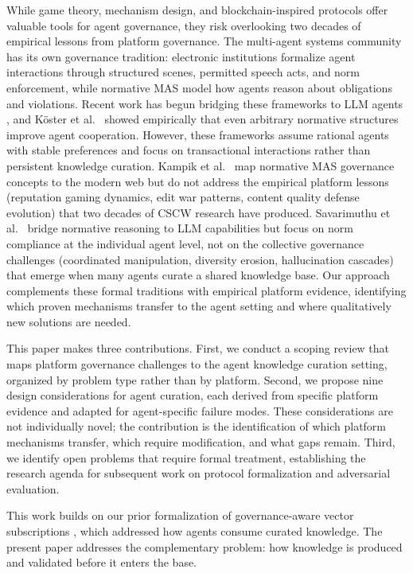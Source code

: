\documentclass[11pt]{article}
\begin{document}
While game theory, mechanism design, and blockchain-inspired protocols offer valuable tools for agent governance, they risk overlooking two decades of empirical lessons from platform governance. The multi-agent systems community has its own governance tradition: electronic institutions \cite{esteva2002} formalize agent interactions through structured scenes, permitted speech acts, and norm enforcement, while normative MAS \cite{boella2004} model how agents reason about obligations and violations. Recent work has begun bridging these frameworks to LLM agents \cite{savarimuthu2025, kampik2022}, and K\"{o}ster et al.~\cite{koster2022} showed empirically that even arbitrary normative structures improve agent cooperation. However, these frameworks assume rational agents with stable preferences and focus on transactional interactions rather than persistent knowledge curation. Kampik et al.~\cite{kampik2022} map normative MAS governance concepts to the modern web but do not address the empirical platform lessons (reputation gaming dynamics, edit war patterns, content quality defense evolution) that two decades of CSCW research have produced. Savarimuthu et al.~\cite{savarimuthu2025} bridge normative reasoning to LLM capabilities but focus on norm compliance at the individual agent level, not on the collective governance challenges (coordinated manipulation, diversity erosion, hallucination cascades) that emerge when many agents curate a shared knowledge base. Our approach complements these formal traditions with empirical platform evidence, identifying which proven mechanisms transfer to the agent setting and where qualitatively new solutions are needed.

This paper makes three contributions. First, we conduct a scoping review that maps platform governance challenges to the agent knowledge curation setting, organized by problem type rather than by platform. Second, we propose nine design considerations for agent curation, each derived from specific platform evidence and adapted for agent-specific failure modes. These considerations are not individually novel; the contribution is the identification of which platform mechanisms transfer, which require modification, and what gaps remain. Third, we identify open problems that require formal treatment, establishing the research agenda for subsequent work on protocol formalization and adversarial evaluation.

This work builds on our prior formalization of governance-aware vector subscriptions \cite{johnson2026a}, which addressed how agents consume curated knowledge. The present paper addresses the complementary problem: how knowledge is produced and validated before it enters the base.
\end{document}

